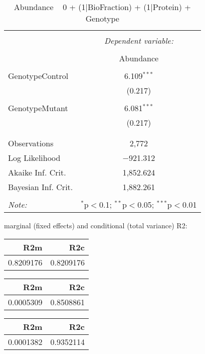 \documentclass[11pt]{report}
\begin{document}
\begin{table}[!htbp] \centering 
  \caption{Abundance ~ 0 + (1|BioFraction) + (1|Protein) + Genotype} 
  \label{} 
\begin{tabular}{@{\extracolsep{5pt}}lc} 
\\[-1.8ex]\hline 
\hline \\[-1.8ex] 
 & \multicolumn{1}{c}{\textit{Dependent variable:}} \\ 
\cline{2-2} 
\\[-1.8ex] & Abundance \\ 
\hline \\[-1.8ex] 
 GenotypeControl & 6.109$^{***}$ \\ 
  & (0.217) \\ 
  & \\ 
 GenotypeMutant & 6.081$^{***}$ \\ 
  & (0.217) \\ 
  & \\ 
\hline \\[-1.8ex] 
Observations & 2,772 \\ 
Log Likelihood & $-$921.312 \\ 
Akaike Inf. Crit. & 1,852.624 \\ 
Bayesian Inf. Crit. & 1,882.261 \\ 
\hline 
\hline \\[-1.8ex] 
\textit{Note:}  & \multicolumn{1}{r}{$^{*}$p$<$0.1; $^{**}$p$<$0.05; $^{***}$p$<$0.01} \\ 
\end{tabular} 
\end{table} 
marginal (fixed effects) and conditional (total variance) R2:

\begin{tabular}{r|r}
\hline
R2m & R2c\\
\hline
0.8209176 & 0.8209176\\
\hline
\end{tabular}

\begin{tabular}{r|r}
\hline
R2m & R2c\\
\hline
0.0005309 & 0.8508861\\
\hline
\end{tabular}

\begin{tabular}{r|r}
\hline
R2m & R2c\\
\hline
0.0001382 & 0.9352114\\
\hline
\end{tabular}
\end{document}
